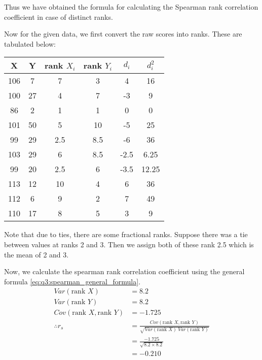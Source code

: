 \documentclass[12pt, oneside]{article}
\begin{document}
\begin{enumerate}
{    Thus we have obtained the formula for calculating the Spearman rank correlation coefficient in case
    of distinct ranks.

    Now for the given data, we first convert the raw scores into ranks. These are tabulated below:

    \begin{center}
        \begin{tabular}{ | c | c | c | c | c | c |}
            \hline
            X & Y & rank \(X_i\) & rank \(Y_i\) & \(d_i\) & \(d_i^2\)\\
            \hline
            106 &	7  & 7  &   3  & 4 & 16\\
            100 &  	27 & 4  &   7  & -3 & 9\\
            86 & 2     & 1  &   1  & 0 & 0\\
            101 &	50 & 5  &   10 & -5 & 25\\
            99 &	29 & 2.5  & 8.5  & -6 & 36\\
            103 &	29 & 6  &  8.5 & -2.5 & 6.25\\
            99 &	20 & 2.5  & 6  & -3.5 & 12.25\\
            113 &	12 & 10  &  4  & 6 & 36\\
            112 &	6  & 9  &   2 & 7 & 49\\
            110 &	17 & 8  &   5 & 3 & 9\\
            \hline
        \end{tabular}
    \end{center}

    Note that due to ties, there are some fractional ranks. Suppose there was a tie
    between values at ranks 2 and 3. Then we assign both of these rank 2.5 which is
    the mean of 2 and 3.

    Now, we calculate the spearman rank correlation coefficient using the general 
    formula \eqref{eq:q3:spearman_general_formula}.
    \begin{align*}
        Var(\text{rank } X) &= 8.2 \\
        Var(\text{rank } Y) &= 8.2 \\
        Cov(\text{rank } X, \text{rank } Y) &= -1.725 \\
        \therefore r_s &= \frac{Cov(\text{rank } X, \text{rank } Y)}{\sqrt{Var(\text{rank } X) ~Var(\text{rank } Y)}} \\
            &= \frac{-1.725}{\sqrt{8.2 \times 8.2}} \\
            &= -0.210
    \end{align*}

}
\end{enumerate}
\end{document}

